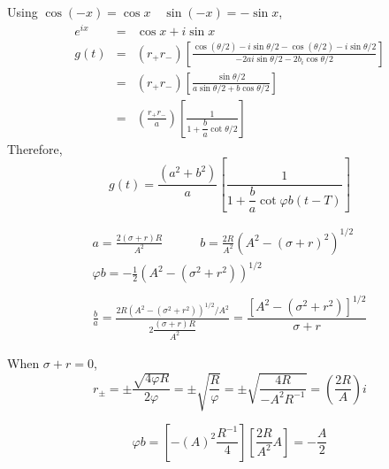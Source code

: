 \documentclass[12pt,compress,handout]{beamer}  %
\begin{document}
\begin{frame}
Using $\cos (-x)=\cos x\quad \sin (-x)=-\sin x$,
\begin{eqnarray*}
e^{ix}&=&\cos x+i\sin x \\
g(t)&=&(r_{+}r_{-})\left[ \frac{\cos (\theta /2)-i\sin \theta /2-\cos (\theta
/2)-i\sin \theta /2}{-2ai\sin \theta /2-2b_i\cos \theta /2}\right] \\
&=&(r_{+}r_{-})\left[ \frac{\sin \theta /2}{a\sin \theta /2+b\cos
\theta /2}\right] \\
&=&\left( \frac{r_{+}r_{-}}a\right) \left[ \frac 1{1+\dfrac ba\cot
\theta /2}\right]
\end{eqnarray*}
Therefore,
\begin{equation*}
g(t) =\frac{(a^2+b^2)}a\left[ \frac 1{1+\dfrac ba\cot \varphi
b(t-T)}\right]
\end{equation*}
\end{frame}


\begin{frame}
\begin{gather*}
a=\frac{2(\sigma+r)R}{A^2} \qquad \quad
b=\frac{2R}{A^2}(A^2-(\sigma+r)^2)^{1/2}\\
\varphi b =-\frac 12(A^2-(\sigma ^2+r^2))^{1/2} \\
\\
\frac ba =\frac{2R(A^2-(\sigma ^2+r^2))^{1/2}/A^2}{2\dfrac{(\sigma +r)R}{A^2}}
=\dfrac{[A^2-(\sigma ^2+r^2)]^{1/2}}{\sigma +r}
\end{gather*}

When $\sigma +r=0$,
\begin{equation*}
r_{\pm } =\pm \frac{\sqrt{4\varphi R}}{2\varphi }=\pm \sqrt{\frac{R}{\varphi}}
=\pm \sqrt{\frac{4R}{-A^2R^{-1}}} =\left( \frac{2R}A\right) i
\end{equation*}

\begin{equation*}
\varphi b =\left[ -(A)^2\dfrac{R^{-1}}4\right] \left[ \dfrac{2R}{A^2} A\right]
=-\dfrac A2
\end{equation*}
\end{frame}
\end{document}
